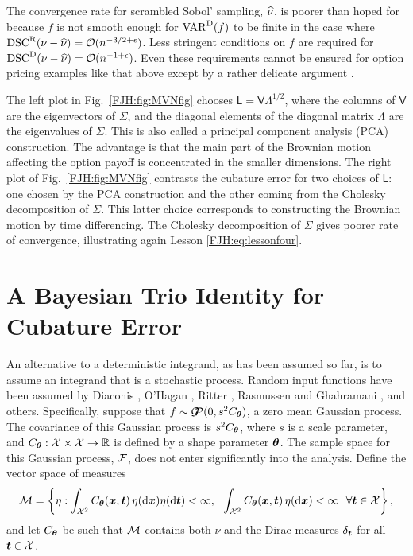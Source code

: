 \documentclass[graybox,footinfo]{svmult}
\DeclareMathOperator{\disc}{DSC}
\DeclareMathOperator{\Var}{VAR}
\DeclareMathOperator{\GP}{\calG\!\!\calP}
\begin{document}
The convergence rate for scrambled Sobol' sampling, $\widehat{\nu}$,  is poorer than hoped for 
because 
$f$ is not smooth enough for $\Var^{\Dt}(f)$ to be finite in the case 
where $\disc^\Rn(\nu - \hnu) = \calO(n^{-3/2 +\epsilon})$.  Less 
stringent conditions on $f$ are required for $\disc^\Dt(\nu - \hnu) = 
\calO(n^{-1 +\epsilon})$.  Even these requirements cannot 
be ensured for option pricing examples like that above except by a rather delicate 
argument \cite{GriKuoSlo10, GriKuoSlo16}.

\begin{FJHLesson}
	\FJHLessonFive
\end{FJHLesson}

The left plot in Fig.\ \ref{FJH:fig:MVNfig} chooses $\mathsf{L} = 
\mathsf{V}\mathsf{\Lambda}^{1/2}$, where the columns of $\mathsf{V}$ are the 
eigenvectors of $\mathsf{\Sigma}$, and the diagonal elements of the diagonal matrix  
$\mathsf{\Lambda}$ are the eigenvalues of $\mathsf{\Sigma}$.  This is also called a 
principal component analysis (PCA) construction.  The advantage is that the main part of 
the 
Brownian motion affecting the option payoff is concentrated in the smaller dimensions.  
The right plot of Fig.\ 
\ref{FJH:fig:MVNfig} contrasts the cubature error for two choices of  $\mathsf{L}$:  one 
chosen by the PCA construction and the other coming from the Cholesky decomposition 
of $\mathsf{\Sigma}$.  This latter choice corresponds to constructing the Brownian 
motion by time 
differencing.  The Cholesky decomposition of $\mathsf{\Sigma}$ gives poorer rate of 
convergence, illustrating again Lesson \ref{FJH:eq:lessonfour}.


\section{A Bayesian Trio  Identity for Cubature Error} \label{FJH:sec:BayesTrio}
An alternative to a deterministic integrand, as has been assumed so far, is to assume an 
integrand that is a stochastic process.  Random input functions have been assumed by 
Diaconis \cite{Dia88a}, O'Hagan \cite{OHa91a}, Ritter \cite{Rit00a}, Rasmussen and 
Ghahramani \cite{RasGha03a}, and others. Specifically, suppose that $f \sim \GP (0, 
s^2C_{\bstheta})$, a zero mean Gaussian process.  The covariance of 
this  Gaussian process is $s^2C_{{\boldsymbol{\theta}}}$, where $s$ is a scale parameter, and 
$C_{{\boldsymbol{\theta}}}:{\mathcal{X}} \times {\mathcal{X}} \to {\mathbb{R}}$ is defined by a shape parameter ${\boldsymbol{\theta}}$.  
The 
sample space for this Gaussian process, ${\mathcal{F}}$, does not enter significantly into the 
analysis.  Define the vector space of measures 
\begin{equation*}
{\mathcal{M}} = \left\{\eta :  \int_{{\mathcal{X}}^2} C_{\boldsymbol{\theta}}({\boldsymbol{x}},{\boldsymbol{t}}) 
\, \eta(\mathrm{d} {\boldsymbol{x}}) \eta(\mathrm{d} {\boldsymbol{t}}) < \infty, \ \ \int_{{\mathcal{X}}^2} C_{\boldsymbol{\theta}}({\boldsymbol{x}},{\boldsymbol{t}}) 
\, \eta(\mathrm{d} {\boldsymbol{x}}) < \infty \ \ \forall {\boldsymbol{t}} \in {\mathcal{X}} \right \},
\end{equation*}
and let $C_{{\boldsymbol{\theta}}}$ be such that ${\mathcal{M}}$ contains both $\nu$ and the Dirac 
measures 
$\delta_{{\boldsymbol{t}}}$ for all ${\boldsymbol{t}} \in {\mathcal{X}}$. 
\end{document}

